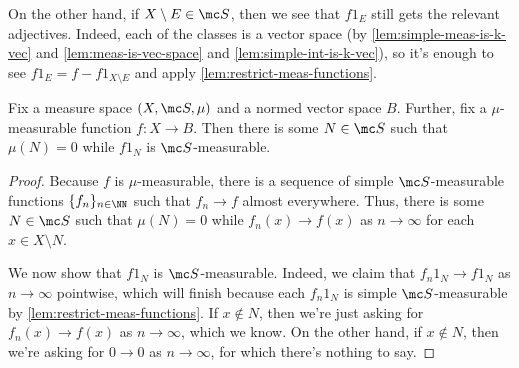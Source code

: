 \documentclass[../notes.tex]{subfiles}
\begin{document}
\begin{remark} \label{rem:complement-restrict-meas-functions}
	On the other hand, if $X\setminus E\in\mc S$, then we see that $f1_E$ still gets the relevant adjectives. Indeed, each of the classes is a vector space (by \autoref{lem:simple-meas-is-k-vec} and \autoref{lem:meas-is-vec-space} and \autoref{lem:simple-int-is-k-vec}), so it's enough to see $f1_E=f-f1_{X\setminus E}$ and apply \autoref{lem:restrict-meas-functions}.
\end{remark}
\begin{corollary} \label{cor:mu-meas-to-s-meas}
	Fix a measure space $(X,\mc S,\mu)$ and a normed vector space $B$. Further, fix a $\mu$-measurable function $f\colon X\to B$. Then there is some $N\in\mc S$ such that $\mu(N)=0$ while $f1_N$ is $\mc S$-measurable.
\end{corollary}
\begin{proof}
	Because $f$ is $\mu$-measurable, there is a sequence of simple $\mc S$-measurable functions $\{f_n\}_{n\in\NN}$ such that $f_n\to f$ almost everywhere. Thus, there is some $N\in\mc S$ such that $\mu(N)=0$ while $f_n(x)\to f(x)$ as $n\to\infty$ for each $x\in X\setminus N$.

	We now show that $f1_N$ is $\mc S$-measurable. Indeed, we claim that $f_n1_N\to f1_N$ as $n\to\infty$ pointwise, which will finish because each $f_n1_N$ is simple $\mc S$-measurable by \autoref{lem:restrict-meas-functions}. If $x\notin N$, then we're just asking for $f_n(x)\to f(x)$ as $n\to\infty$, which we know. On the other hand, if $x\notin N$, then we're asking for $0\to0$ as $n\to\infty$, for which there's nothing to say.
\end{proof}
\end{document}
